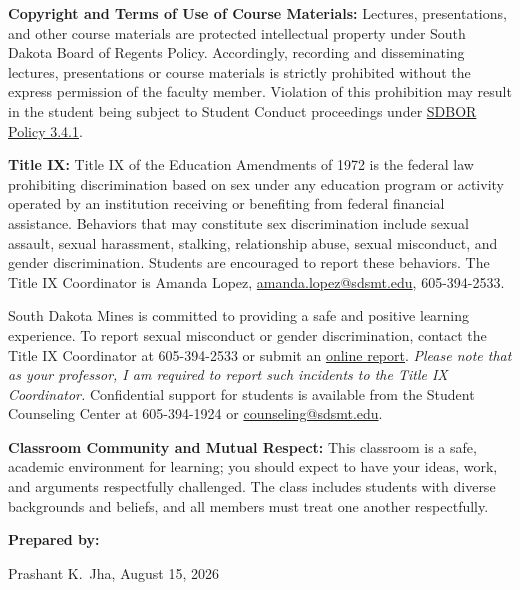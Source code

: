 \documentclass[12pt]{article}
\newcommand{\coursefield}[2]{%
  \vspace{0.2em}\noindent\textbf{#1} #2\par
}
\begin{document}
\coursefield{Copyright and Terms of Use of Course Materials:}{Lectures, presentations, and other course materials are protected intellectual property under South Dakota Board of Regents Policy. Accordingly, recording and disseminating lectures, presentations or course materials is strictly prohibited without the express permission of the faculty member. Violation of this prohibition may result in the student being subject to Student Conduct proceedings under \href{https://public.powerdms.com/SDRegents/tree/documents/1680638}{SDBOR Policy 3.4.1}.
}

\coursefield{Title IX:}{Title IX of the Education Amendments of 1972 is the federal law prohibiting discrimination based on sex under any education program or activity operated by an institution receiving or benefiting from federal financial assistance. Behaviors that may constitute sex discrimination include sexual assault, sexual harassment, stalking, relationship abuse, sexual misconduct, and gender discrimination. Students are encouraged to report these behaviors. The Title IX Coordinator is Amanda Lopez, \href{mailto:amanda.lopez@sdsmt.edu}{amanda.lopez@sdsmt.edu}, 605-394-2533.

South Dakota Mines is committed to providing a safe and positive learning experience. To report sexual misconduct or gender discrimination, contact the Title IX Coordinator at 605-394-2533 or submit an \href{https://sdsmt-advocate.symplicity.com/public_report/index.php/pid360859?}{online report}. \textit{Please note that as your professor, I am required to report such incidents to the Title IX Coordinator.} Confidential support for students is available from the Student Counseling Center at 605-394-1924 or \href{mailto:counseling@sdsmt.edu}{counseling@sdsmt.edu}.
}

\coursefield{Classroom Community and Mutual Respect:}{
This classroom is a safe, academic environment for learning; you should expect to have your ideas, work, and arguments respectfully challenged. The class includes students with diverse backgrounds and beliefs, and all members must treat one another respectfully.
}

\vfill
\textbf{Prepared by:}

Prashant K.\ Jha, August 15, 2026
\end{document}
